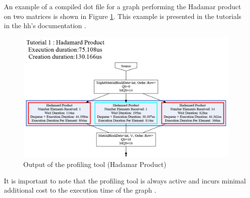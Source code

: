 An example of a compiled dot file for a graph performing the Hadamar product
on two matrices is shown in Figure \ref{fig:tuto1}. This example is
presented in the tutorials in the \gls{hh}'s documentation \cite{hh:tuto}.

\begin{figure}[h!]
  \begin{center}
    \includegraphics[scale=0.4]{img/Tutorial1HadamardProduct.png}
    \caption{Output of the profiling tool (Hadamar Product)}
    \label{fig:tuto1}
  \end{center}
\end{figure}

It is important to note that the profiling tool is always active and incurs
minimal additional cost to the execution time of the graph
\cite{bardakoff2021analysis}.
